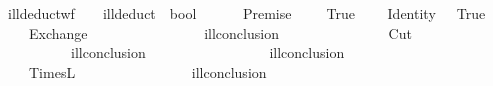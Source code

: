 \isamarkupfalse%
\ ill{\isacharunderscore}deduct{\isacharunderscore}wf\ {\isacharcolon}{\isacharcolon}\ {\isachardoublequoteopen}{\isacharparenleft}\ \ ill{\isacharunderscore}deduct\ {\isasymRightarrow}\ bool{\isachardoublequoteclose}\ \isanewline
\ \ \ \ {\isachardoublequoteopen}\ {\isacharparenleft}Premise\ \ \ \ {\isacharequal}\ True{\isachardoublequoteclose}\isanewline
\ \ {\isacharbar}\ {\isachardoublequoteopen}\ {\isacharparenleft}Identity\ \ {\isacharequal}\ True{\isachardoublequoteclose}\isanewline
\ \ {\isacharbar}\ {\isachardoublequoteopen}\ {\isacharparenleft}Exchange\ \ \ \ \ \ \ {\isacharequal}\isanewline
\ \ \ \ \ \ {\isacharparenleft}\ \ {\isasymand}\ ill{\isacharunderscore}conclusion\ \ {\isacharequal}\ \ {\isacharat}\ {\isacharbrackleft}\ {\isacharat}\ {\isacharbrackleft}\ {\isacharat}\ \ {\isasymturnstile}\ \isanewline
\ \ {\isacharbar}\ {\isachardoublequoteopen}\ {\isacharparenleft}Cut\ \ \ \ \ \ \ \ {\isacharequal}\isanewline
\ \ \ \ \ \ {\isacharparenleft}\ \ \ {\isasymand}\ ill{\isacharunderscore}conclusion\ \ {\isacharequal}\ \ {\isasymturnstile}\ \ {\isasymand}\isanewline
\ \ \ \ \ \ \ \ \ \ {\isasymand}\ ill{\isacharunderscore}conclusion\ \ {\isacharequal}\ \ {\isacharat}\ {\isacharbrackleft}\ {\isacharat}\ \ {\isasymturnstile}\ \isanewline
\ \ {\isacharbar}\ {\isachardoublequoteopen}\ {\isacharparenleft}TimesL\ \ \ \ \ \ \ {\isacharequal}\isanewline
\ \ \ \ \ \ {\isacharparenleft}\ \ {\isasymand}\ ill{\isacharunderscore}conclusion\ \ {\isacharequal}\ \ {\isacharat}\ {\isacharbrackleft}\ {\isacharat}\ {\isacharbrackleft}\ {\isacharat}\ \ {\isasymturnstile}\ \isanewline
